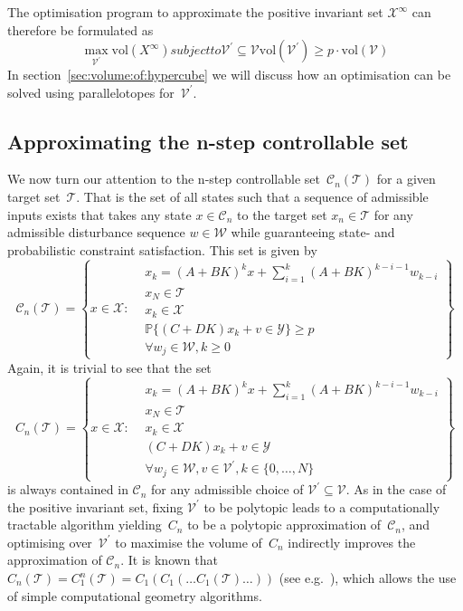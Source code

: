 \documentclass{ifacconf}
\providecommand{\vol}{\text{vol}}
\providecommand{\C}{\mathcal C}
\providecommand{\W}{\mathcal W}
\providecommand{\V}{\mathcal V}
\providecommand{\X}{\mathcal X}
\providecommand{\Y}{\mathcal Y}
\providecommand{\T}{\mathcal T}
\providecommand{\PP}{\mathbb P}
\begin{document}
The optimisation program to approximate the positive invariant set $\X^\infty$ can therefore be formulated as
%
\begin{subequations}\label{seq:optimisation:MRPI:abstract}
	\begin{equation}
		\max_{\V^\prime} \vol(X^\infty)
	\end{equation}
%
	subject to
%
\begin{equation}
	\V^\prime\subseteq\V
\end{equation}
%
\begin{equation}
	\vol(\V^\prime)\geq p\cdot\vol(\V)
\end{equation}
\end{subequations}
%
In section~\ref{sec:volume:of:hypercube} we will discuss how an optimisation can be solved using parallelotopes for~$\V^\prime$.


\subsection{Approximating the n-step controllable set}\label{ssec:approximating:n:step}
%
We now turn our attention to the n-step controllable set~$\C_n(\T)$ for a given target set~$\T$.
%
That is the set of all states such that a sequence of admissible inputs exists that takes any state $x\in\C_n$ to the target set $x_n\in\T$ for any admissible disturbance sequence $w\in\W$ while guaranteeing state- and probabilistic constraint satisfaction.
%
This set is given by
%
\begin{equation}
	\C_n(\T) = \left\{x\in\X:\begin{aligned}&x_k = (A+BK)^k x + \sum_{i=1}^{k} (A+BK)^{k-i-1} w_{k-i}\\
	&x_N\in\T\\
	&x_k\in\X\\
	&\PP\{(C+DK)x_k+v\in\Y\}\geq p\\
	&\forall w_j\in\W,k\geq 0\end{aligned} \right\}	
\end{equation}
%
Again, it is trivial to see that the set
%
\begin{equation}
	C_n(\T) = \left\{x\in\X:\begin{aligned}&x_k = (A+BK)^k x + \sum_{i=1}^{k} (A+BK)^{k-i-1} w_{k-i}\\
	&x_N\in\T\\
	&x_k\in\X\\
	&(C+DK)x_k+v\in\Y\\
	&\forall w_j\in\W,v\in \V^\prime,k\in\{0,\dots,N\}\end{aligned} \right\}	
\end{equation}
%
is always contained in $\C_n$ for any admissible choice of $\V^\prime\subseteq\V$.
%
As in the case of the positive invariant set, fixing $\V^\prime$ to be polytopic leads to a computationally tractable algorithm yielding~$C_n$ to be a polytopic approximation of~$\C_n$, and optimising over~$\V^\prime$ to maximise the volume of~$C_n$ indirectly improves the approximation of $\C_n$.
%
It is known that $C_n(\T) = C^n_1(\T) = C_1(C_1(\dots C_1(\T)\dots))$ (see e.g.~\cite{blanchini:2007}), which allows the use of simple computational geometry algorithms.
\end{document}
